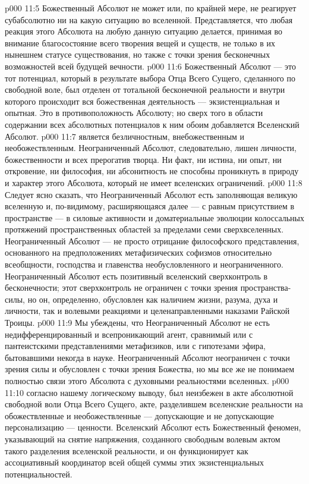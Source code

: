 \vs p000 11:5 Божественный Абсолют не может или, по крайней мере, не реагирует субабсолютно ни на какую ситуацию во вселенной. Представляется, что любая реакция этого Абсолюта на любую данную ситуацию делается, принимая во внимание благосостояние всего творения вещей и существ, не только в их нынешнем статусе существования, но также с точки зрения бесконечных возможностей всей будущей вечности.
\vs p000 11:6 Божественный Абсолют --- это тот потенциал, который в результате выбора Отца Всего Сущего, сделанного по свободной воле, был отделен от тотальной бесконечной реальности и внутри которого происходит вся божественная деятельность --- экзистенциальная и опытная. Это  в противоположность  Абсолюту; но сверх того в области содержании всех абсолютных потенциалов к ним обоим добавляется Вселенский Абсолют.
\vs p000 11:7 \bibnobreakspace {} является безличностным, внебожественным и необожествленным. Неограниченный Абсолют, следовательно, лишен личности, божественности и всех прерогатив творца. Ни факт, ни истина, ни опыт, ни откровение, ни философия, ни абсонитность не способны проникнуть в природу и характер этого Абсолюта, который не имеет вселенских ограничений.
\vs p000 11:8 Следует ясно сказать, что Неограниченный Абсолют есть  заполняющая великую вселенную и, по\hyp{}видимому, расширяющаяся далее --- с равным присутствием в пространстве --- в силовые активности и доматериальные эволюции колоссальных протяжений пространственных областей за пределами семи сверхвселенных. Неограниченный Абсолют --- не просто отрицание философского представления, основанного на предположениях метафизических софизмов относительно всеобщности, господства и главенства необусловленного и неограниченного. Неограниченный Абсолют есть позитивный вселенский сверхконтроль в бесконечности; этот сверхконтроль не ограничен с точки зрения пространства\hyp{}силы, но он, определенно, обусловлен как наличием жизни, разума, духа и личности, так и волевыми реакциями и целенаправленными наказами Райской Троицы.
\vs p000 11:9 Мы убеждены, что Неограниченный Абсолют не есть недифференцированный и всепроникающий агент, сравнимый или с пантеистскими представлениями метафизиков, или с гипотезами эфира, бытовавшими некогда в науке. Неограниченный Абсолют неограничен с точки зрения силы и обусловлен с точки зрения Божества, но мы все же не понимаем полностью связи этого Абсолюта с духовными реальностями вселенных.
\vs p000 11:10 \bibnobreakspace {} согласно нашему логическому выводу, был неизбежен в акте абсолютной свободной воли Отца Всего Сущего, акте, разделившем вселенские реальности на обожествленные и необожествленные --- допускающие и не допускающие персонализацию --- ценности. Вселенский Абсолют есть Божественный феномен, указывающий на снятие напряжения, созданного свободным волевым актом такого разделения вселенской реальности, и он функционирует как ассоциативный координатор всей общей суммы этих экзистенциальных потенциальностей.
